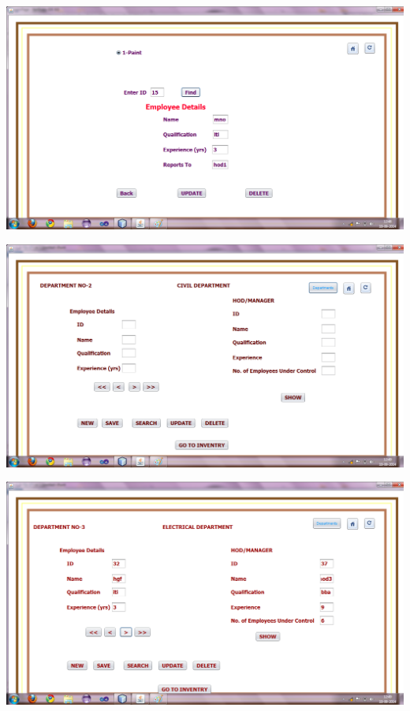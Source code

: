 \documentclass[12pt,a4paper]{report}
\begin{document}
\begin{center}
\includegraphics[scale=0.45]{15.png}
\end{center}
\begin{center}
\includegraphics[scale=0.45]{17.png}
\end{center}
\begin{center}
\includegraphics[scale=0.45]{18.png}
\end{center}
\end{document}
